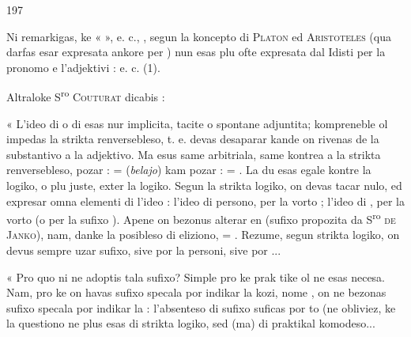 \begin{VUpage}[201]{197}

Ni remarkigas, ke «  », e. c., , segun\nl
la koncepto di \textsc{Platon} ed \textsc{Aristoteles} (qua darfas esar\nl
expresata ankore per ) nun esas plu ofte\nl
expresata dal Idisti per la pronomo  e l'adjektivi : \nl
{} e. c. (1).

Altraloke S\textsuperscript{ro} \textsc{Couturat} dicabis :

« L'ideo di  o di  esas nur implicita, tacite\nl
o spontane adjuntita; kompreneble ol impedas la strikta\nl
renversebleso, t. e. devas desaparar kande on rivenas de la\nl
substantivo a la adjektivo. Ma esus same arbitriala, same\nl
kontrea a la strikta renversebleso, pozar :  = \nl
(\textit{belajo}) kam pozar :  = . La du\nl
esas egale kontre la logiko, o plu juste, exter la logiko.\nl
Segun la strikta logiko, on devas tacar nulo, ed expresar\nl
omna elementi di l'ideo : l'ideo di persono, per la vorto\nl
{}; l'ideo di , per la vorto  (o per la sufixo ).\nl
Apene on bezonus alterar  en  (sufixo propozita da\nl
S\textsuperscript{ro} \textsc{de Janko}), nam, danke la posibleso di eliziono, \nl
{} = . Rezume, segun strikta logiko, on devus\nl
sempre uzar sufixo, sive por la personi, sive por ...

« Pro quo ni ne adoptis tala sufixo? Simple pro ke prak\cc
tike ol ne esas necesa. Nam, pro ke on havas sufixo specala\nl
por indikar la kozi, nome , on ne bezonas sufixo specala\nl
por indikar la  : l'absenteso di sufixo suficas por to\nl
(ne obliviez, ke la questiono ne plus esas di strikta logiko,\nl
sed (ma) di praktikal komodeso...


\end{VUpage}
